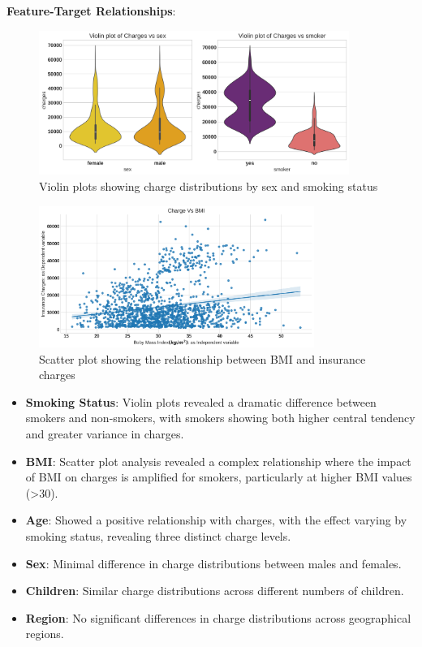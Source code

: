 \documentclass[12pt,a4paper]{article}
\begin{document}
\newpage

\textbf{Feature-Target Relationships}:

\begin{figure}[H]
\centering
\includegraphics[width=0.9\textwidth]{violin_plots_sex_smoker.png}
\caption{Violin plots showing charge distributions by sex and smoking status}
\label{fig:violin_plots_sex_smoker}
\end{figure}

\begin{figure}[H]
\centering
\includegraphics[width=0.8\textwidth]{charges_vs_bmi.png}
\caption{Scatter plot showing the relationship between BMI and insurance charges}
\label{fig:charges_vs_bmi}
\end{figure}

\begin{itemize}
    \item \textbf{Smoking Status}: Violin plots revealed a dramatic difference between smokers and non-smokers, with smokers showing both higher central tendency and greater variance in charges.
    \item \textbf{BMI}: Scatter plot analysis revealed a complex relationship where the impact of BMI on charges is amplified for smokers, particularly at higher BMI values (>30).
    \item \textbf{Age}: Showed a positive relationship with charges, with the effect varying by smoking status, revealing three distinct charge levels.
    \item \textbf{Sex}: Minimal difference in charge distributions between males and females.
    \item \textbf{Children}: Similar charge distributions across different numbers of children.
    \item \textbf{Region}: No significant differences in charge distributions across geographical regions.
\end{itemize}
\end{document}
